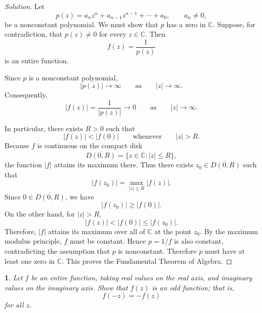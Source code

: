 \documentclass[12pt, a4paper]{report}
\theoremstyle{spaced}
\newtheorem{exercise}{}
\begin{document}
\begin{proof}[Solution]
	Let
	\[
		p(z)=a_nz^n+a_{n-1}z^{n-1}+\cdots+a_0,
		\qquad a_n\neq 0,
	\]
	be a nonconstant polynomial. We must show that \(p\) has a zero in
	\(\mathbb{C}\).
	Suppose, for contradiction, that \(p(z)\neq 0\) for every
	\(z\in\mathbb{C}\). Then
	\[
		f(z)=\frac{1}{p(z)}
	\]
	is an entire function.

	Since \(p\) is a nonconstant polynomial,
	\[
		|p(z)|\longrightarrow\infty
		\qquad\text{as}\qquad
		|z|\longrightarrow\infty.
	\]
	Consequently,
	\[
		|f(z)|=\frac{1}{|p(z)|}\longrightarrow 0
		\qquad\text{as}\qquad
		|z|\longrightarrow\infty.
	\]

	In particular, there exists \(R>0\) such that
	\[
		|f(z)|<|f(0)|
		\qquad\text{whenever}\qquad
		|z|>R.
	\]
	Because \(f\) is continuous on the compact disk
	\[
		\overline{D(0,R)}=\{z\in\mathbb{C}:|z|\leq R\},
	\]
	the function \(|f|\) attains its maximum there. Thus there exists
	\(z_0\in\overline{D(0,R)}\) such that
	\[
		|f(z_0)|
		=
		\max_{|z|\leq R}|f(z)|.
	\]
	Since \(0\in\overline{D(0,R)}\), we have
	\[
		|f(z_0)|\geq |f(0)|.
	\]
	On the other hand, for \(|z|>R\),
	\[
		|f(z)|<|f(0)|\leq |f(z_0)|.
	\]
	Therefore, \(|f|\) attains its maximum over all of \(\mathbb{C}\) at
	the point \(z_0\).
	By the maximum modulus principle, \(f\) must be constant. Hence
	\(p=1/f\) is also constant, contradicting the assumption that \(p\)
	is nonconstant.
	Therefore \(p\) must have at least one zero in \(\mathbb{C}\). This
	proves the Fundamental Theorem of Algebra.
\end{proof}

\begin{exercise}
	Let \(f\) be an entire function, taking real values on the real axis, and imaginary
	values on the imaginary axis. Show that \(f(z)\) is an odd function; that is,
	\[
		f(-z)=-f(z)
	\]
	for all \(z\).
\end{exercise}
\end{document}
